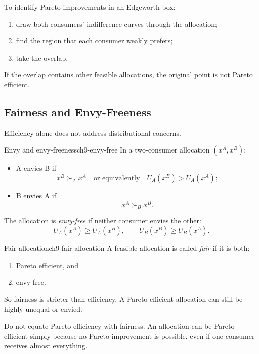 \begin{examtip}
To identify Pareto improvements in an Edgeworth box:
\begin{enumerate}
    \item draw both consumers' indifference curves through the allocation;
    \item find the region that each consumer weakly prefers;
    \item take the overlap.
\end{enumerate}
If the overlap contains other feasible allocations, the original point is not Pareto efficient.
\end{examtip}

\subsection{Fairness and Envy-Freeness}

Efficiency alone does not address distributional concerns.

\begin{definition}{Envy and envy-freeness}{ch9-envy-free}
In a two-consumer allocation $(x^A,x^B)$:
\begin{itemize}
    \item A envies B if
    \[
    x^B \succ_A x^A
    \quad \text{or equivalently} \quad
    U_A(x^B)>U_A(x^A);
    \]
    \item B envies A if
    \[
    x^A \succ_B x^B.
    \]
\end{itemize}
The allocation is \emph{envy-free} if neither consumer envies the other:
\[
U_A(x^A)\ge U_A(x^B),
\qquad
U_B(x^B)\ge U_B(x^A).
\]
\end{definition}

\begin{definition}{Fair allocation}{ch9-fair-allocation}
A feasible allocation is called \emph{fair} if it is both:
\begin{enumerate}
    \item Pareto efficient, and
    \item envy-free.
\end{enumerate}
\end{definition}

So fairness is stricter than efficiency. A Pareto-efficient allocation can still be highly unequal or envied.

\begin{commonmistake}
Do not equate Pareto efficiency with fairness. An allocation can be Pareto efficient simply because no Pareto improvement is possible, even if one consumer receives almost everything.
\end{commonmistake}

